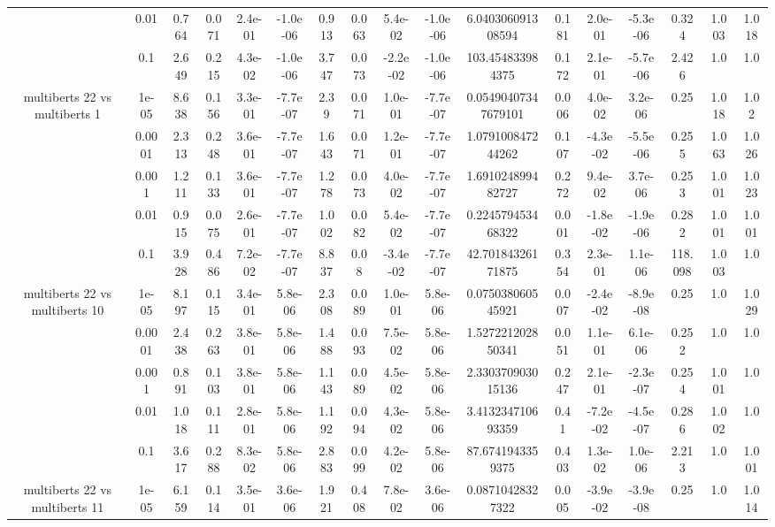 \begin{tabular}{|c|c|c|c|c|c|c|c|c|c|c|c|c|c|c|c|c|}
 & 0.01 & 0.764 & 0.071 & 2.4e-01 & -1.0e-06 & 0.913 & 0.063 & 5.4e-02 & -1.0e-06 & 6.040306091308594 & 0.181 & 2.0e-01 & -5.3e-06 & 0.324 & 1.003 & 1.018 \\
 & 0.1 & 2.649 & 0.215 & 4.3e-02 & -1.0e-06 & 3.747 & 0.073 & -2.2e-02 & -1.0e-06 & 103.454833984375 & 0.172 & 2.1e-01 & -5.7e-06 & 2.426 & 1.0 & 1.0 \\
\hline
\multirow{5}{*}{multiberts 22 vs multiberts 1} & 1e-05 & 8.638 & 0.156 & 3.3e-01 & -7.7e-07 & 2.39 & 0.071 & 1.0e-01 & -7.7e-07 & 0.05490407347679101 & 0.006 & 4.0e-02 & 3.2e-06 & 0.25 & 1.018 & 1.02 \\
 & 0.0001 & 2.313 & 0.248 & 3.6e-01 & -7.7e-07 & 1.643 & 0.071 & 1.2e-01 & -7.7e-07 & 1.079100847244262 & 0.107 & -4.3e-02 & -5.5e-06 & 0.255 & 1.063 & 1.026 \\
 & 0.001 & 1.211 & 0.133 & 3.6e-01 & -7.7e-07 & 1.278 & 0.073 & 4.0e-02 & -7.7e-07 & 1.691024899482727 & 0.272 & 9.4e-02 & 3.7e-06 & 0.253 & 1.001 & 1.023 \\
 & 0.01 & 0.915 & 0.075 & 2.6e-01 & -7.7e-07 & 1.002 & 0.082 & 5.4e-02 & -7.7e-07 & 0.224579453468322 & 0.001 & -1.8e-02 & -1.9e-06 & 0.282 & 1.001 & 1.001 \\
 & 0.1 & 3.928 & 0.486 & 7.2e-02 & -7.7e-07 & 8.837 & 0.08 & -3.4e-02 & -7.7e-07 & 42.70184326171875 & 0.354 & 2.3e-01 & 1.1e-06 & 118.098 & 1.003 & 1.0 \\
\hline
\multirow{5}{*}{multiberts 22 vs multiberts 10} & 1e-05 & 8.197 & 0.115 & 3.4e-01 & 5.8e-06 & 2.308 & 0.089 & 1.0e-01 & 5.8e-06 & 0.075038060545921 & 0.007 & -2.4e-02 & -8.9e-08 & 0.25 & 1.0 & 1.029 \\
 & 0.0001 & 2.438 & 0.263 & 3.8e-01 & 5.8e-06 & 1.488 & 0.093 & 7.5e-02 & 5.8e-06 & 1.527221202850341 & 0.051 & 1.1e-01 & 6.1e-06 & 0.252 & 1.0 & 1.0 \\
 & 0.001 & 0.891 & 0.103 & 3.8e-01 & 5.8e-06 & 1.143 & 0.089 & 4.5e-02 & 5.8e-06 & 2.330370903015136 & 0.247 & 2.1e-01 & -2.3e-07 & 0.254 & 1.001 & 1.0 \\
 & 0.01 & 1.018 & 0.111 & 2.8e-01 & 5.8e-06 & 1.192 & 0.094 & 4.3e-02 & 5.8e-06 & 3.413234710693359 & 0.41 & -7.2e-02 & -4.5e-07 & 0.286 & 1.002 & 1.0 \\
 & 0.1 & 3.617 & 0.288 & 8.3e-02 & 5.8e-06 & 2.883 & 0.099 & 4.2e-02 & 5.8e-06 & 87.6741943359375 & 0.403 & 1.3e-02 & 1.0e-06 & 2.213 & 1.0 & 1.001 \\
\hline
\multirow{5}{*}{multiberts 22 vs multiberts 11} & 1e-05 & 6.159 & 0.114 & 3.5e-01 & 3.6e-06 & 1.921 & 0.408 & 7.8e-02 & 3.6e-06 & 0.08710428327322 & 0.005 & -3.9e-02 & -3.9e-08 & 0.25 & 1.0 & 1.014 \\

\end{tabular}
